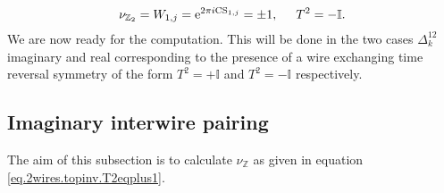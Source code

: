 \begin{equation}
\nu_{\mathbb{Z}_2} = W_{1,j} = \text{e}^{2\pi i\text{CS}_{1,j}} = \pm 1, \hspace{0.5cm} T^2 = -\mathbb{I}.
\label{eq.2wires.topinv.T2eqminus1}
\end{equation}
We are now ready for the computation. This will be done in the two cases $\Delta^{12}_k$ imaginary and real corresponding to the presence of a wire exchanging time reversal symmetry of the form $T^2 = +\mathbb{I}$ and $T^2 = -\mathbb{I}$ respectively.  

\subsection{Imaginary interwire pairing}
\label{subsec.2wires_CSinv_Delta12imag}
The aim of this subsection is to calculate $\nu_{\mathbb{Z}}$ as given in equation \eqref{eq.2wires.topinv.T2eqplus1}. 


